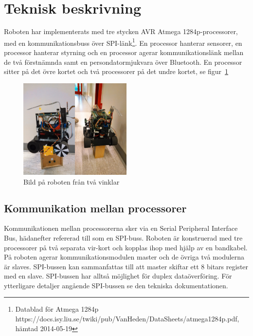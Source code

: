 \documentclass[a4paper,12pt,fleqn]{article}
\begin{document}
\section{Teknisk beskrivning}
Roboten har implementerats med tre stycken AVR Atmega 1284p-processorer, med en kommunikationsbuss över SPI-länk\footnote{Datablad för Atmega 1284p https://docs.isy.liu.se/twiki/pub/VanHeden/DataSheets/atmega1284p.pdf, hämtad 2014-05-19}. En processor hanterar sensorer, en processor hanterar styrning och en processor agerar kommunikationslänk mellan de två förstnämnda samt en persondatormjukvara över Bluetooth. En processor sitter på det övre kortet och två processorer på det undre kortet, se figur~\ref{fig:robot}

\begin{figure}[htp] %
  \begin{center}
  \includegraphics[keepaspectratio=true,width=0.5\textwidth]{robot.png}  %
  \end{center}
  \caption{Bild på roboten från två vinklar} %
  \label{fig:robot}
\end{figure}

\subsection{Kommunikation mellan processorer}
Kommunikationen mellan processorerna sker via en Serial Peripheral Interface Bus, hädanefter refererad till som en SPI-buss.
Roboten är konstruerad med tre processorer på två separata vir-kort och kopplas ihop med hjälp av en bandkabel. På roboten agerar kommunikationsmodulen master och de övriga två modulerna är slaves. SPI-bussen kan sammanfattas till att master skiftar ett 8 bitars register med en slave. SPI-bussen har alltså möjlighet för duplex dataöverföring. För ytterligare detaljer angående SPI-bussen se den tekniska dokumentationen.
\end{document}
